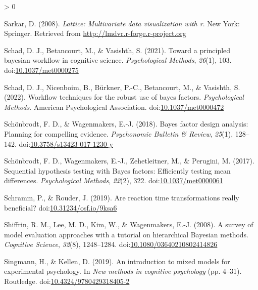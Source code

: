 \documentclass[
  english,
  doc,floatsintext]{apa6}
\newlength{\cslhangindent}
\newenvironment{CSLReferences}[2] %
 {%
  \setlength{\parindent}{0pt}
  \ifodd #1 \everypar{\setlength{\hangindent}{\cslhangindent}}\ignorespaces\fi
  \ifnum #2 > 0
  \setlength{\parskip}{#2\baselineskip}
  \fi
 }%
 {}
\begin{document}
\begin{CSLReferences}{1}{0}
\leavevmode\hypertarget{ref-R-lattice}{}%
Sarkar, D. (2008). \emph{Lattice: Multivariate data visualization with r}. New York: Springer. Retrieved from \url{http://lmdvr.r-forge.r-project.org}

\leavevmode\hypertarget{ref-schad2021toward}{}%
Schad, D. J., Betancourt, M., \& Vasishth, S. (2021). Toward a principled bayesian workflow in cognitive science. \emph{Psychological Methods}, \emph{26}(1), 103. doi:\href{https://doi.org/10.1037/met0000275}{10.1037/met0000275}

\leavevmode\hypertarget{ref-schad2021workflow}{}%
Schad, D. J., Nicenboim, B., Bürkner, P.-C., Betancourt, M., \& Vasishth, S. (2022). Workflow techniques for the robust use of bayes factors. \emph{Psychological Methods}. American Psychological Association. doi:\href{https://doi.org/10.1037/met0000472}{10.1037/met0000472}

\leavevmode\hypertarget{ref-schonbrodt2018bayes}{}%
Schönbrodt, F. D., \& Wagenmakers, E.-J. (2018). Bayes factor design analysis: Planning for compelling evidence. \emph{Psychonomic Bulletin \& Review}, \emph{25}(1), 128--142. doi:\href{https://doi.org/10.3758/s13423-017-1230-y}{10.3758/s13423-017-1230-y}

\leavevmode\hypertarget{ref-schonbrodt2017sequential}{}%
Schönbrodt, F. D., Wagenmakers, E.-J., Zehetleitner, M., \& Perugini, M. (2017). Sequential hypothesis testing with {Bayes} factors: Efficiently testing mean differences. \emph{Psychological Methods}, \emph{22}(2), 322. doi:\href{https://doi.org/10.1037/met0000061}{10.1037/met0000061}

\leavevmode\hypertarget{ref-schramm2019reaction}{}%
Schramm, P., \& Rouder, J. (2019). Are reaction time transformations really beneficial? doi:\href{https://doi.org/10.31234/osf.io/9ksa6}{10.31234/osf.io/9ksa6}

\leavevmode\hypertarget{ref-shiffrin2008survey}{}%
Shiffrin, R. M., Lee, M. D., Kim, W., \& Wagenmakers, E.-J. (2008). A survey of model evaluation approaches with a tutorial on hierarchical {Bayesian} methods. \emph{Cognitive Science}, \emph{32}(8), 1248--1284. doi:\href{https://doi.org/10.1080/03640210802414826}{10.1080/03640210802414826}

\leavevmode\hypertarget{ref-singmann2019introduction}{}%
Singmann, H., \& Kellen, D. (2019). An introduction to mixed models for experimental psychology. In \emph{New methods in cognitive psychology} (pp. 4--31). Routledge. doi:\href{https://doi.org/10.4324/9780429318405-2}{10.4324/9780429318405-2}


\end{CSLReferences}
\end{document}
